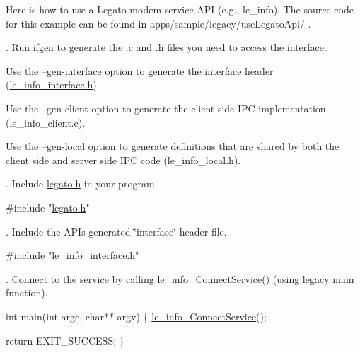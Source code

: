 Here is how to use a Legato modem service A\+P\+I (e.\+g., le\+\_\+info). The source code for this example can be found in {\ttfamily  apps/sample/legacy/use\+Legato\+Api/ }.

{}. Run {\ttfamily ifgen} to generate the .c and .h files you need to access the interface.


\begin{DoxyItemize}
\item Use the {\ttfamily --gen-\/interface} option to generate the interface header ({\ttfamily \hyperlink{le__info__interface_8h}{le\+\_\+info\+\_\+interface.\+h}}).
\item Use the {\ttfamily --gen-\/client} option to generate the client-\/side I\+P\+C implementation ({\ttfamily le\+\_\+info\+\_\+client.\+c}).
\item Use the {\ttfamily --gen-\/local} option to generate definitions that are shared by both the client side and server side I\+P\+C code ({\ttfamily le\+\_\+info\+\_\+local.\+h}).
\end{DoxyItemize}



{}. Include {\ttfamily \hyperlink{legato_8h}{legato.\+h}} in your program.


\begin{DoxyCode}
\textcolor{preprocessor}{#include "\hyperlink{legato_8h}{legato.h}"}
\end{DoxyCode}


{}. Include the A\+P\+I\textquotesingle{}s generated \char`\"{}interface\char`\"{} header file.


\begin{DoxyCode}
\textcolor{preprocessor}{#include "\hyperlink{le__info__interface_8h}{le\_info\_interface.h}"}
\end{DoxyCode}


{}. Connect to the service by calling \hyperlink{le__info__interface_8h_ae1a4655ecfee5f91a69c772d204b569d}{le\+\_\+info\+\_\+\+Connect\+Service()} (using legacy main function).


\begin{DoxyCode}
\textcolor{keywordtype}{int} main(\textcolor{keywordtype}{int} argc, \textcolor{keywordtype}{char}** argv)
\{
    \hyperlink{le__info__interface_8h_ae1a4655ecfee5f91a69c772d204b569d}{le\_info\_ConnectService}();

    \textcolor{keywordflow}{return} EXIT\_SUCCESS;
\}
\end{DoxyCode}


